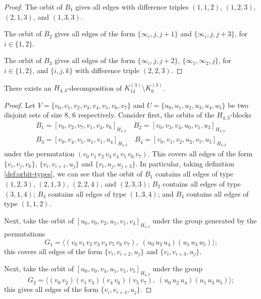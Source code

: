 \begin{subappendices}
\begin{proof}
The orbit of $B_1$ gives all edges with difference triples $(1, 1, 2)$, $(1, 2, 3)$, $(2, 1, 3)$, and $(1, 3, 3)$.

The orbit of $B_2$ gives all edges of the form $\{\infty_i, j, j+1\}$ and $\{\infty_i, j, j+3\}$, for $i \in \{1, 2\}$.

The orbit of $B_3$ gives all edges of the form $\{\infty_i, j, j+2\}$, $\{\infty_1, \infty_2, j\}$, for $i \in \{1, 2\}$, and $\{i, j, k\}$ with difference triple $(2, 2, 3)$.
\end{proof}


\begin{example} \label{eg:H_43-k14-k6}
There exists an $H_{4,3}$-decomposition of $K_{14}^{(3)} \setminus K_{6}^{(3)}$.
\end{example}

\begin{proof}
Let $V = \{v_0, v_1, v_2, v_3, v_4, v_5, v_6, v_7\}$ and $U = \{u_0, u_1, u_2,
u_3, u_4, u_5\}$ be two disjoint sets of size 8, 6 respectively. Consider first, the orbits of the $H_{4,3}$-blocks
\begin{align*}
    B_1 = [v_0, v_2, v_7, v_1, v_4, v_6]_{H_{4,3}} \quad
    B_2 = [v_0, v_3, v_4, u_0, v_1, u_3]_{H_{4,3}} \\
    B_3 = [v_0, v_4, v_5, u_1, v_1, u_4]_{H_{4,3}} \quad
    B_4 = [v_0, v_1, v_2, u_2, v_7, u_5]_{H_{4,3}}
\end{align*}
under the permutation $(v_0 \, v_1 \, v_2 \, v_3 \, v_4 \, v_5 \, v_6 \, v_7)$.
This covers all edges of the form $\{v_i, v_j, v_k\}$, $\{v_i, v_{i+1}, u_j\}$ and $\{v_i, u_j, u_{j+3}\}$.
In particular, taking definition \ref{def:orbit-types},
we can see that the orbit of $B_1$ contains all edges of type $(1, 2, 3)$, $(2, 1, 3)$, $(2, 2, 4)$, and $(2, 3, 3)$;
$B_2$ contains all edges of type $(3, 1, 4)$; $B_3$ contains all edges of type $(1, 3, 4)$; and $B_4$ contains all edges of type $(1, 1, 2)$.

Next, take the orbit of $[u_0, v_0, v_2, u_1, v_1, v_4]_{H_{4,3}}$ under the group generated by the permutations
\[
    G_1 = \langle (v_0 \, v_1 \, v_2 \, v_3 \, v_4 \, v_5 \, v_6 \, v_7),
    \; (u_0 \, u_2 \, u_4) (u_1 \, u_3 \, u_5) \rangle;
\]
this covers all edges of the form $\{v_i, v_{i+2}, u_j\}$ and $\{v_i, v_{i+3}, u_j\}$.

Next, take the orbit of $[u_0, v_0, v_4, u_1, v_1, v_5]_{H_{4,3}}$ under the group
\[
    G_2 = \langle (v_0 \, v_2) (v_1 \, v_3) (v_4 \, v_6) (v_5 \, v_7), \;
    (u_0 \, u_2 \, u_4) (u_1 \, u_3 \, u_5) \rangle;
\]
this gives all edges of the form $\{v_i, v_{i+4}, u_j\}$.


\end{proof}
\end{subappendices}
